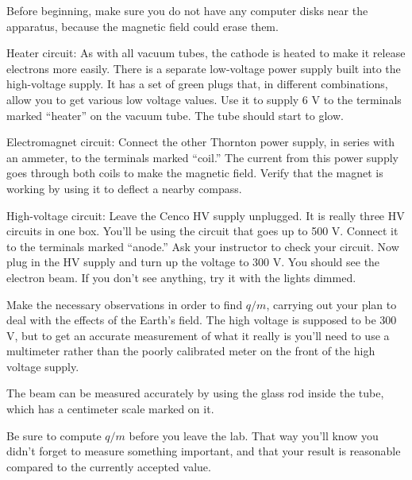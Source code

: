 \hvsafety


\setup

Before beginning, make sure you do not have any computer
disks near the apparatus, because the magnetic field could erase them.

Heater circuit: As with all vacuum tubes, the cathode is
heated to make it release electrons more easily.
There is a separate low-voltage power supply built into
the high-voltage supply. It has a set of green plugs that, in different
combinations, allow you to get various low voltage values.
Use it to supply 6 V to the terminals
marked ``heater'' on the vacuum tube.
The tube should start to glow.

Electromagnet circuit: Connect the other Thornton power
supply, in series with an ammeter, to the terminals marked
``coil.'' The current from this power supply goes through
both coils to make the magnetic field. Verify that the
magnet is working by using it to deflect a nearby compass.

High-voltage circuit: Leave the Cenco HV supply unplugged.
It is really three HV circuits in one box. You'll be using
the circuit that goes up to 500 V.
Connect it to the
terminals marked ``anode.'' Ask your instructor to check
your circuit. Now plug in the HV supply and turn up the
voltage to 300 V. You should see the electron beam. If you
don't see anything, try it with the lights dimmed.

\observations

Make the necessary observations in order to find $q/m$,
carrying out your plan to deal with the effects of the
Earth's field. The high voltage is supposed to be 300 V,
but to get an accurate measurement of what it really is
you'll need to use a multimeter rather than the poorly
calibrated meter on the front of the high voltage supply.

The beam can be measured accurately by using the glass
rod inside the tube, which has a centimeter scale marked
on it.

Be sure to compute $q/m$ before you leave the lab. That way
you'll know you didn't forget to measure something
important, and that your result is reasonable compared to
the currently accepted value.

